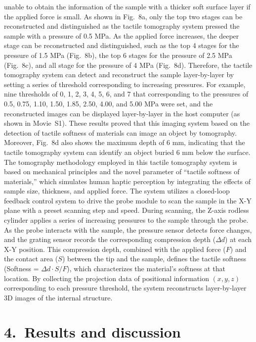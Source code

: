 \documentclass[11pt]{article}
\begin{document}
unable to obtain the information of the sample with a thicker soft
surface layer if the applied force is small. As shown in Fig.~8a,
only the top two stages can be reconstructed and distinguished as
the tactile tomography system pressed the sample with a pressure of
0.5 MPa. As the applied force increases, the deeper stage can be
reconstructed and distinguished, such as the top 4 stages for the
pressure of 1.5 MPa (Fig.~8b), the top 6 stages for the pressure of
2.5 MPa (Fig.~8c), and all stage for the pressure of 4 MPa
(Fig.~8d). Therefore, the tactile tomography system can detect and
reconstruct the sample layer-by-layer by setting a series of
threshold corresponding to increasing pressures. For example, nine
thresholds of 0, 1, 2, 3, 4, 5, 6, and 7 that corresponding to the
pressures of 0.5, 0.75, 1.10, 1.50, 1.85, 2.50, 4.00, and 5.00 MPa
were set, and the reconstructed images can be displayed
layer-by-layer in the host computer (as shown in Movie~S1). These
results proved that this imaging system based on the detection of
tactile softness of materials can image an object by tomography.
Moreover, Fig.~8d also shows the maximum depth of 6 mm, indicating
that the tactile tomography system can identify an object buried
6 mm below the surface. The tomography methodology employed in this
tactile tomography system is based on mechanical principles and the
novel parameter of ``tactile softness of materials,'' which
simulates human haptic perception by integrating the effects of
sample size, thickness, and applied force. The system utilizes a
closed-loop feedback control system to drive the probe module to
scan the sample in the X-Y plane with a preset scanning step and
speed. During scanning, the Z-axis rodless cylinder applies a
series of increasing pressures to the sample through the probe. As
the probe interacts with the sample, the pressure sensor detects
force changes, and the grating sensor records the corresponding
compression depth ($\Delta d$) at each X-Y position. This
compression depth, combined with the applied force ($F$) and the
contact area ($S$) between the tip and the sample, defines the
tactile softness (Softness = $\Delta d \cdot S / F$), which
characterizes the material's softness at that location. By
collecting the projection data of positional information
$(x, y, z)$ corresponding to each pressure threshold, the system
reconstructs layer-by-layer 3D images of the internal structure.

\section*{4.\ Results and discussion}
\end{document}
